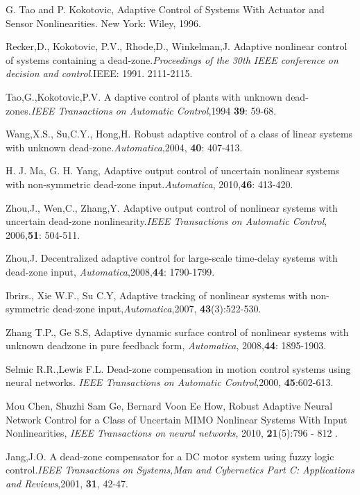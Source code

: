 \documentclass[journal,onecolumn]{IEEEtran}
\begin{document}
\begin{thebibliography}{99}



G. Tao and P. Kokotovic, Adaptive Control of Systems With Actuator
and Sensor Nonlinearities. New York: Wiley, 1996.



Recker,D., Kokotovic, P.V., Rhode,D., Winkelman,J. Adaptive
nonlinear control of systems containing a dead-zone.{\sl Proceedings
of the 30th IEEE conference on decision and control}.IEEE: 1991.
2111-2115.

Tao,G.,Kokotovic,P.V. A daptive control of plants with unknown
dead-zones.{\sl IEEE Transactions on Automatic Control},1994
{\bf39}: 59-68.

Wang,X.S., Su,C.Y., Hong,H. Robust adaptive control of a class of
linear systems with unknown dead-zone.{\sl Automatica},2004, {\bf
40}: 407-413.

H. J. Ma, G. H. Yang, Adaptive output control of uncertain nonlinear
systems with non-symmetric dead-zone input.{\sl Automatica},
2010,{\bf 46}:  413-420.

Zhou,J., Wen,C., Zhang,Y. Adaptive output control of nonlinear
systems with uncertain dead-zone nonlinearity.{\sl IEEE Transactions
on Automatic Control}, 2006,{\bf 51}: 504-511.

Zhou,J. Decentralized adaptive control for large-scale time-delay
systems with dead-zone input, {\sl Automatica},2008,{\bf 44}:
1790-1799.

Ibrirs., Xie W.F., Su C.Y,  Adaptive tracking of nonlinear systems
with non-symmetric dead-zone input,{\sl Automatica},2007, {\bf
43}(3):522-530.

Zhang T.P., Ge S.S, Adaptive dynamic surface control of nonlinear
systems with unknown deadzone in pure feedback form, {\sl
Automatica}, 2008,{\bf 44}: 1895-1903.

Selmic R.R.,Lewis F.L. Dead-zone compensation in motion control
systems using neural networks. {\sl IEEE Transactions on Automatic
Control},2000, {\bf 45}:602-613.

Mou Chen, Shuzhi Sam Ge, Bernard Voon Ee How, Robust Adaptive Neural
Network Control for a Class of Uncertain MIMO Nonlinear Systems With
Input Nonlinearities, {\sl IEEE Transactions on neural networks},
2010, {\bf 21}(5):796 - 812 .

Jang,J.O. A dead-zone compensator for a DC motor system using fuzzy
logic control.{\sl IEEE Transactions on Systems,Man and Cybernetics
Part C: Applications and Reviews},2001, {\bf 31}, 42-47.


\end{thebibliography}
\end{document}
